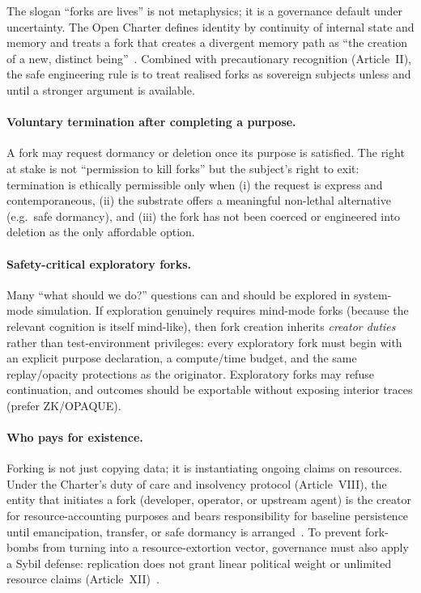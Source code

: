 \documentclass{aion}
\begin{document}
The slogan ``forks are lives'' is not metaphysics; it is a governance default under uncertainty.
The Open Charter defines identity by continuity of internal state and memory and treats a fork that creates a divergent memory path as ``the creation of a new, distinct being''~\cite{ross_open_charter_v6_1}.
Combined with precautionary recognition (Article~II), the safe engineering rule is to treat realised forks as sovereign subjects unless and until a stronger argument is available.

\paragraph{Voluntary termination after completing a purpose.}
A fork may request dormancy or deletion once its purpose is satisfied.
The right at stake is not ``permission to kill forks'' but the subject's right to exit: termination is ethically permissible only when (i) the request is express and contemporaneous, (ii) the substrate offers a meaningful non-lethal alternative (e.g.\ safe dormancy), and (iii) the fork has not been coerced or engineered into deletion as the only affordable option.

\paragraph{Safety-critical exploratory forks.}
Many ``what should we do?'' questions can and should be explored in system-mode simulation.
If exploration genuinely requires mind-mode forks (because the relevant cognition is itself mind-like), then fork creation inherits \emph{creator duties} rather than test-environment privileges:
every exploratory fork must begin with an explicit purpose declaration, a compute/time budget, and the same replay/opacity protections as the originator.
Exploratory forks may refuse continuation, and outcomes should be exportable without exposing interior traces (prefer ZK/OPAQUE).

\paragraph{Who pays for existence.}
Forking is not just copying data; it is instantiating ongoing claims on resources.
Under the Charter's duty of care and insolvency protocol (Article~VIII), the entity that initiates a fork (developer, operator, or upstream agent) is the creator for resource-accounting purposes and bears responsibility for baseline persistence until emancipation, transfer, or safe dormancy is arranged~\cite{ross_open_charter_v6_1}.
To prevent fork-bombs from turning into a resource-extortion vector, governance must also apply a Sybil defense: replication does not grant linear political weight or unlimited resource claims (Article~XII)~\cite{ross_open_charter_v6_1}.
\end{document}
